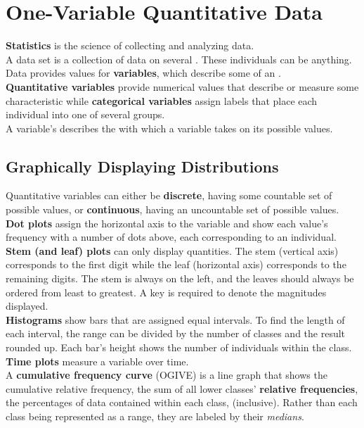 \documentclass[../AP_Statistics.tex]{subfiles}
\begin{document}
	\chapter{One-Variable Quantitative Data}
		\textbf{Statistics} is the science of collecting and analyzing data. \\
		A data set is a collection of data on several . These individuals can be anything. \\
		Data provides values for \textbf{variables}, which describe some  of an . \\
		\textbf{Quantitative variables} provide numerical values that describe or measure some characteristic while \textbf{categorical variables} assign labels that place each individual into one of several groups. \\
		A variable's  describes the  with which a variable takes on its possible values.
		\section{Graphically Displaying Distributions}
			Quantitative variables can either be \textbf{discrete}, having some countable set of possible values, or \textbf{continuous}, having an uncountable set of possible values.
			\textbf{Dot plots} assign the horizontal axis to the variable and show each value's frequency with a number of dots above, each corresponding to an individual. \\
			\textbf{Stem (and leaf) plots} can only display quantities. The stem (vertical axis) corresponds to the first digit while the leaf (horizontal axis) corresponds to the remaining digits. The stem is always on the left, and the leaves should always be ordered from least to greatest. A key is required to denote the magnitudes displayed. \\
			\textbf{Histograms} show bars that are assigned equal intervals. To find the length of each interval, the range can be divided by the number of classes and the result rounded up. Each bar's height shows the number of individuals within the class. \\
			\textbf{Time plots} measure a variable over time. \\
			A \textbf{cumulative frequency curve} (OGIVE) is a line graph that shows the cumulative relative frequency, the sum of all lower classes' \textbf{relative frequencies}, the percentages of data contained within each class, (inclusive). Rather than each class being represented as a range, they are labeled by their \emph{medians}.
\end{document}
